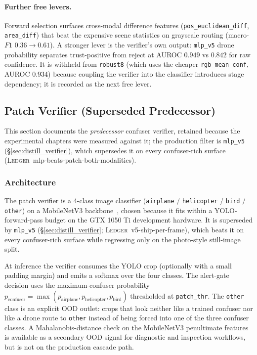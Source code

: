 \paragraph{Further free levers.}
Forward selection surfaces cross-modal difference features (\texttt{pos\_euclidean\_diff}, \texttt{area\_diff}) that beat the expensive scene statistics on grayscale routing (macro-$F1$ $0.36 \to 0.61$). A stronger lever is the verifier's own output: \texttt{mlp\_v5} drone probability separates trust-positive from reject at AUROC $0.949$ vs $0.842$ for raw confidence. It is withheld from \texttt{robust8} (which uses the cheaper \texttt{rgb\_mean\_conf}, AUROC $0.934$) because coupling the verifier into the classifier introduces stage dependency; it is recorded as the next free lever.

\subsection{Patch Verifier (Superseded Predecessor)}
\label{sec:patch_verifier_arch}

This section documents the \emph{predecessor} confuser verifier, retained because the experimental chapters were measured against it; the production filter is \texttt{mlp\_v5} (\S\ref{sec:distill_verifier}), which supersedes it on every confuser-rich surface (\textsc{Ledger}~mlp-beats-patch-both-modalities).

\subsubsection{Architecture}

The patch verifier is a 4-class image classifier (\texttt{airplane} / \texttt{helicopter} / \texttt{bird} / \texttt{other}) on a MobileNetV3 backbone~\cite{howard2019mobilenetv3}, chosen because it fits within a YOLO-forward-pass budget on the GTX 1050 Ti development hardware. It is superseded by \texttt{mlp\_v5} (\S\ref{sec:distill_verifier}; \textsc{Ledger}~v5-ship-per-frame), which beats it on every confuser-rich surface while regressing only on the photo-style still-image split.

At inference the verifier consumes the YOLO crop (optionally with a small padding margin) and emits a softmax over the four classes. The alert-gate decision uses the maximum-confuser probability $p_\text{confuser} = \max(p_\text{airplane}, p_\text{helicopter}, p_\text{bird})$ thresholded at \texttt{patch\_thr}. The \texttt{other} class is an explicit OOD outlet: crops that look neither like a trained confuser nor like a drone route to \texttt{other} instead of being forced into one of the three confuser classes. A Mahalanobis-distance check on the MobileNetV3 penultimate features is available as a secondary OOD signal for diagnostic and inspection workflows, but is not on the production cascade path.

